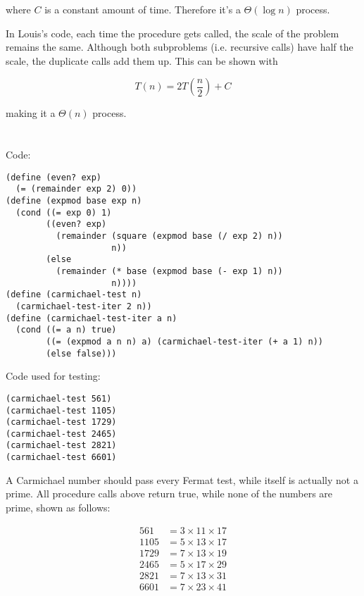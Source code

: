 \documentclass[a4paper]{report}
\begin{document}
where $C$ is a constant amount of time. Therefore it's a $\Theta(\log n)$ process.

In Louis's code, each time the procedure gets called, the scale of the problem remains the same. Although
 both subproblems (i.e. recursive calls) have half the scale, the duplicate calls add them up.
 This can be shown with

$$
T(n) = 2T(\frac{n}{2}) + C
$$

making it a $\Theta(n)$ process.


\section{}

Code:

\begin{lstlisting}
(define (even? exp)
  (= (remainder exp 2) 0))
(define (expmod base exp n)
  (cond ((= exp 0) 1)
        ((even? exp)
          (remainder (square (expmod base (/ exp 2) n)) 
                     n))
        (else
          (remainder (* base (expmod base (- exp 1) n))
                     n))))
(define (carmichael-test n)
  (carmichael-test-iter 2 n))
(define (carmichael-test-iter a n)
  (cond ((= a n) true)
        ((= (expmod a n n) a) (carmichael-test-iter (+ a 1) n))
        (else false)))
\end{lstlisting}

Code used for testing:

\begin{lstlisting}
(carmichael-test 561)
(carmichael-test 1105)
(carmichael-test 1729)
(carmichael-test 2465)
(carmichael-test 2821)
(carmichael-test 6601)
\end{lstlisting}

A Carmichael number should pass every Fermat test, while
 itself is actually not a prime. All procedure calls above
 return true, while none of the numbers are prime, shown
 as follows:

\begin{align*}
561 &= 3 \times 11 \times 17 \\
1105 &= 5 \times 13 \times 17 \\
1729 &= 7 \times 13 \times 19 \\
2465 &= 5 \times 17 \times 29 \\
2821 &= 7 \times 13 \times 31 \\
6601 &= 7 \times 23 \times 41
\end{align*}
\end{document}
